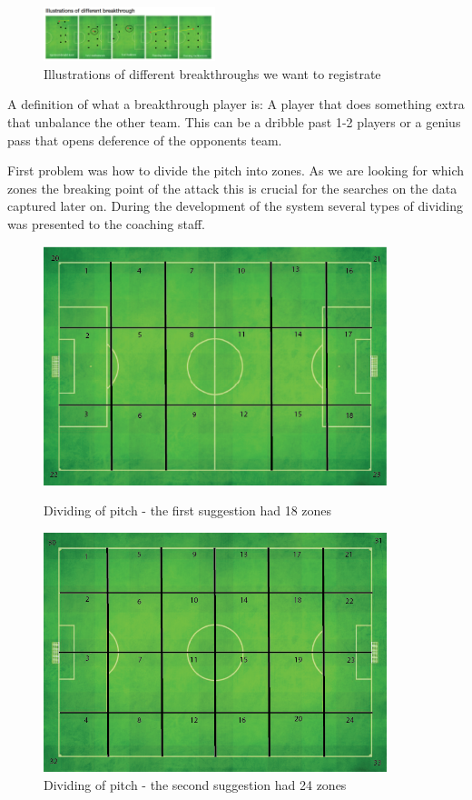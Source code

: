 \begin{figure}[ht!]
\centering
\includegraphics[width=50mm]{images/general/different_breakthroughs.png}
\caption{Illustrations of different breakthroughs we want to registrate}
\label{overflow}
\end{figure}

A definition of what a breakthrough player is: A player that does something extra that unbalance the other team. This can be a dribble past 1-2 players or a genius pass that opens deference of the opponents team. 

First problem was how to divide the pitch into zones. As we are looking for which zones the breaking point of the attack this is crucial for the searches on the data captured later on. During the development of the system several types of dividing was presented to the coaching staff. 

\begin{figure}[ht!]
\centering
\includegraphics[width=100mm]{images/general/first_zones.png}
\caption{Dividing of pitch - the first suggestion had 18 zones}
\includegraphics[width=100mm]{images/general/second_zones.png}
\caption{Dividing of pitch - the second suggestion had 24 zones}
\label{overflow}
\end{figure}

